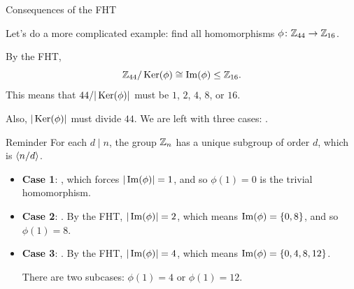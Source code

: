 \documentclass[8pt]{beamer}
\newcommand{\Pause}{}      %
\begin{document}
\begin{frame}{Consequences of the FHT} %
  
  Let's do a more complicated example: find all homomorphisms
  $\phi\colon\mathbb{Z}_{44}\to\mathbb{Z}_{16}$. \medskip\Pause
  
  By the FHT,
  \[
  \mathbb{Z}_{44}/\operatorname{Ker}(\phi)\cong\operatorname{Im}(\phi)\leq\mathbb{Z}_{16}.
  \]
  \Pause This means that $44/|\operatorname{Ker}(\phi)|$ must be $1$, $2$, $4$, \st{$8$},
  or \st{$16$}.
  
  \medskip\Pause
  
  Also, $|\operatorname{Ker}(\phi)|$ must divide $44$. \Pause We are left with
  three cases: . \smallskip\Pause
  
  \begin{exampleblock}{Reminder}
    For each $d\mid n$, the group $\mathbb{Z}_n$ has a unique
    subgroup of order $d$, which is $\langle n/d\rangle$. 
  \end{exampleblock}
  
  \smallskip\Pause
  
  \begin{itemize}
  \item \textbf{Case 1}: , which forces
    $|\operatorname{Im}(\phi)|=1$, and so $\phi(1)=0$ is the trivial
    homomorphism. \medskip\Pause
  \item \textbf{Case 2}: . \Pause By the FHT,
    $|\operatorname{Im}(\phi)|=2$, which means $\operatorname{Im}(\phi)=\{0,8\}$, and so
    $\phi(1)=8$. \medskip\Pause
  \item \textbf{Case 3}: . \Pause By the FHT,
    $|\operatorname{Im}(\phi)|=4$, which means $\operatorname{Im}(\phi)=\{0,4,8,12\}$. \medskip\Pause
    
    There are two subcases: $\phi(1)=4$ or $\phi(1)=12$.
  \end{itemize}
  
\end{frame}

\end{document}
